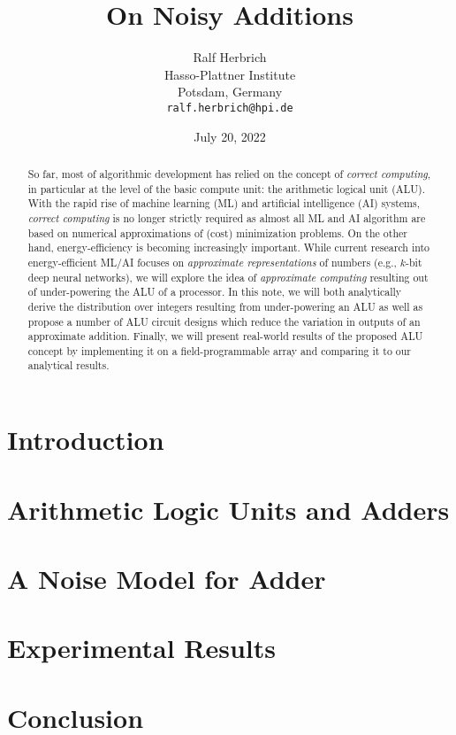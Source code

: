 \documentclass{article}
\title{On Noisy Additions}
\date{July 20, 2022}		%
\author{Ralf Herbrich \\
	Hasso-Plattner Institute\\
	Potsdam, Germany \\
	\texttt{ralf.herbrich@hpi.de} \\
}
\newcommand{\0}{\boldsymbol{0}}
\newcommand{\1}{\boldsymbol{1}}
\begin{document}
\maketitle

\begin{abstract}
	So far, most of algorithmic development has relied on the concept of {\em correct computing}, in particular at the level of the basic compute unit: the arithmetic logical unit (ALU). With the rapid rise of machine learning (ML) and artificial intelligence (AI) systems, {\em correct computing} is no longer strictly required as almost all ML and AI algorithm are based on numerical approximations of (cost) minimization problems. On the other hand, energy-efficiency is becoming increasingly important. While current research into energy-efficient ML/AI focuses on {\em approximate representations} of numbers (e.g., $k$-bit deep neural networks), we will explore the idea of {\em approximate computing} resulting out of under-powering the ALU of a processor. In this note, we will both analytically derive the distribution over integers resulting from under-powering an ALU as well as propose a number of ALU circuit designs which reduce the variation in outputs of an approximate addition. Finally, we will present real-world results of the proposed ALU concept by implementing it on a field-programmable array and comparing it to our analytical results.
\end{abstract}




\section{Introduction}


\section{Arithmetic Logic Units and Adders}


\section{A Noise Model for Adder}


% 

\section{Experimental Results}

\section{Conclusion}

\appendix





\end{document}
